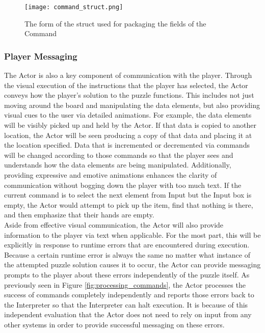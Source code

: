\begin{figure}[!htb]
  \caption{The form of the struct used for packaging the fields of the Command}
  \label{fig:command_struct}
  \centering
  \texttt{[image: command\_struct.png]}
\end{figure}

\subsubsection{Player Messaging}
The Actor is also a key component of communication with the player. Through the visual execution of the instructions that the player has selected, the Actor conveys how the player's solution to the puzzle functions. This includes not just moving around the board and manipulating the data elements, but also providing visual cues to the user via detailed animations. For example, the data elements will be visibly picked up and held by the Actor. If that data is copied to another location, the Actor will be seen producing a copy of that data and placing it at the location specified. Data that is incremented or decremented via commands will be changed according to those commands so that the player sees and understands how the data elements are being manipulated. Additionally, providing expressive and emotive animations enhances the clarity of communication without bogging down the player with too much text. If the current command is to select the next element from Input but the Input box is empty, the Actor would attempt to pick up the item, find that nothing is there, and then emphasize that their hands are empty.\\

Aside from effective visual communication, the Actor will also provide information to the player via text when applicable. For the most part, this will be explicitly in response to runtime errors that are encountered during execution. Because a certain runtime error is always the same no matter what instance of the attempted puzzle solution causes it to occur, the Actor can provide messaging prompts to the player about these errors independently of the puzzle itself. As previously seen in Figure \ref{fig:processing_commands}, the Actor processes the success of commands completely independently and reports those errors back to the Interpreter so that the Interpreter can halt execution. It is because of this independent evaluation that the Actor does not need to rely on input from any other systems in order to provide successful messaging on these errors.\\

